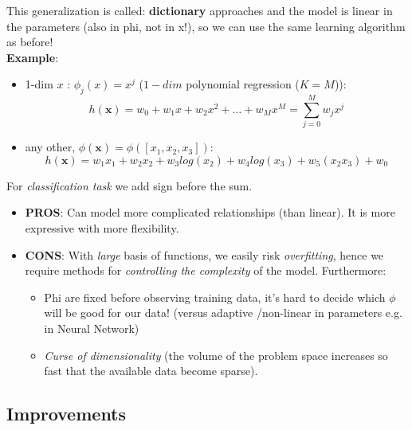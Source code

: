 \documentclass[../main.tex]{subfiles}
\begin{document}
This generalization is called: \textbf{dictionary} approaches and the model is linear in the parameters (also in phi, not in x!), so we can use the same learning algorithm as before!\\

\textbf{Example}:
\begin{itemize}
    \item 1-dim $x$ : $\phi_j(x) = x^j$ ($1-dim$ polynomial regression ($K=M$)):
    $$ h(\mathbf{x}) = w_0 + w_1x + w_2x^2 + \dots + w_Mx^M = \sum_{j = 0}^M w_jx^j$$
    
    \item any other, $\phi(\mathbf{x}) = \phi([x_1, x_2, x_3])$:
    $$  h(\mathbf{x}) = w_1x_1 + w_2x_2 + w_3 log(x_2)+ w_4 log(x_3) + w_5(x_2x_3) + w_0 $$
\end{itemize}

For \emph{classification task} we add sign before the sum.
\begin{itemize}
    \item \textbf{PROS}: Can model more complicated relationships (than linear). It is more expressive with more flexibility.
    \item \textbf{CONS}: With \emph{large} basis of functions, we easily risk \emph{overfitting}, hence we require methods for \emph{controlling the complexity} of the model. Furthermore:
    \begin{itemize}
        \item Phi are fixed before observing training data, it's hard to decide which $\phi$ will be good for our data! (versus adaptive /non-linear in parameters e.g. in Neural Network)
        \item \textit{Curse of dimensionality} (the volume of the problem space increases so fast that the available data become sparse).
    \end{itemize}
\end{itemize}

\subsection{Improvements}
\end{document}
